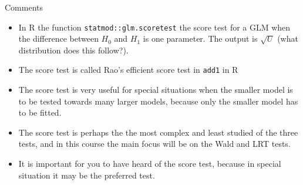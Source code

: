 \documentclass[
  ignorenonframetext,
]{beamer}
\providecommand{\tightlist}{%
  \setlength{\itemsep}{0pt}\setlength{\parskip}{0pt}}
\begin{document}
\begin{frame}[fragile]{Comments}
\label{comments}
\begin{itemize}
\tightlist
\item
  In R the function \texttt{statmod::glm.scoretest} the score test for a
  GLM when the difference between \(H_0\) and \(H_1\) is one parameter.
  The output is \(\sqrt{U}\) (what distribution does this follow?).
\item
  The score test is called Rao's efficient score test in \texttt{add1}
  in R
\item
  The score test is very useful for special situations when the smaller
  model is to be tested towards many larger models, because only the
  smaller model has to be fitted.
\item
  The score test is perhaps the the most complex and least studied of
  the three tests, and in this course the main focus will be on the Wald
  and LRT tests.
\item
  It is important for you to have heard of the score test, because in
  special situation it may be the preferred test.
\end{itemize}
\end{frame}
\end{document}
